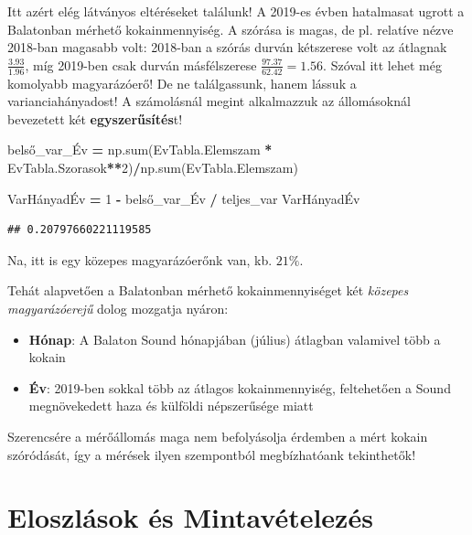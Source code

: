\documentclass[
]{book}
\newenvironment{Shaded}{\begin{snugshade}}{\end{snugshade}}
\newcommand{\BuiltInTok}[1]{#1}
\newcommand{\DecValTok}[1]{\textcolor[rgb]{0.00,0.00,0.81}{#1}}
\newcommand{\NormalTok}[1]{#1}
\newcommand{\OperatorTok}[1]{\textcolor[rgb]{0.81,0.36,0.00}{\textbf{#1}}}
\providecommand{\tightlist}{%
  \setlength{\itemsep}{0pt}\setlength{\parskip}{0pt}}
\begin{document}
Itt azért elég látványos eltéréseket találunk! A 2019-es évben hatalmasat ugrott a Balatonban mérhető kokainmennyiség. A szórása is magas, de pl. relatíve nézve 2018-ban magasabb volt: 2018-ban a szórás durván kétszerese volt az átlagnak \(\frac{3.93}{1.96}\), míg 2019-ben csak durván másfélszerese \(\frac{97.37}{62.42}=1.56\). Szóval itt lehet még komolyabb magyarázóerő!
De ne találgassunk, hanem lássuk a varianciahányadost! A számolásnál megint alkalmazzuk az állomásoknál bevezetett két \textbf{egyszerűsítés}t!

\begin{Shaded}
\begin{Highlighting}[]
\NormalTok{belső\_var\_Év }\OperatorTok{=}\NormalTok{ np.}\BuiltInTok{sum}\NormalTok{(EvTabla.Elemszam }\OperatorTok{*}\NormalTok{ EvTabla.Szorasok}\OperatorTok{**}\DecValTok{2}\NormalTok{)}\OperatorTok{/}\NormalTok{np.}\BuiltInTok{sum}\NormalTok{(EvTabla.Elemszam)}

\NormalTok{VarHányadÉv }\OperatorTok{=} \DecValTok{1} \OperatorTok{{-}}\NormalTok{ belső\_var\_Év }\OperatorTok{/}\NormalTok{ teljes\_var}
\NormalTok{VarHányadÉv}
\end{Highlighting}
\end{Shaded}

\begin{verbatim}
## 0.20797660221119585
\end{verbatim}

Na, itt is egy közepes magyarázóerőnk van, kb. \(21\%\).

Tehát alapvetően a Balatonban mérhető kokainmennyiséget két \emph{közepes magyarázóerejű} dolog mozgatja nyáron:

\begin{itemize}
\tightlist
\item
  \textbf{Hónap}: A Balaton Sound hónapjában (július) átlagban valamivel több a kokain
\item
  \textbf{Év}: 2019-ben sokkal több az átlagos kokainmennyiség, feltehetően a Sound megnövekedett haza és külföldi népszerűsége miatt
\end{itemize}

Szerencsére a mérőállomás maga nem befolyásolja érdemben a mért kokain szóródását, így a mérések ilyen szempontból megbízhatóank tekinthetők!

\chapter{Eloszlások és Mintavételezés}\label{eloszluxe1sok-uxe9s-mintavuxe9telezuxe9s}
\end{document}
